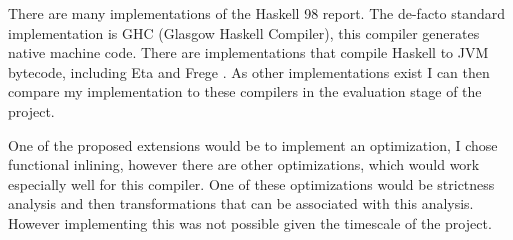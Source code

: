 \documentclass[float=false, crop=false]{standalone}
\begin{document}
There are many implementations of the Haskell 98 report.
The de-facto standard implementation is GHC \cite{ghc} (Glasgow Haskell
Compiler), this compiler generates native machine code. There
are implementations that compile Haskell to JVM bytecode, including Eta \cite{eta}
and Frege \cite{frege}. As other implementations exist I can then 
compare my implementation to these compilers in the evaluation stage
of the project. 

One of the proposed extensions would be to implement an optimization,
I chose functional inlining, however there are other optimizations, which
would work especially well for this compiler. One of these
optimizations would be strictness analysis and
then transformations that can be associated with this analysis. 
However implementing this was not possible given the timescale of the project.



\end{document}
